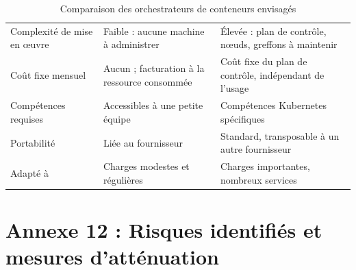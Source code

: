 \begin{table}[htbp]
\centering
\caption{Comparaison des orchestrateurs de conteneurs envisagés}
\label{tab:orchestrateur}
\small
\begin{tabularx}{\textwidth}{|L{3.0cm}|X|X|}
\hline
{}
 &  &  \\ \hline
Complexité de mise en œuvre & Faible : aucune machine à administrer & Élevée : plan de contrôle, nœuds, greffons à maintenir \\ \hline
Coût fixe mensuel & Aucun ; facturation à la ressource consommée & Coût fixe du plan de contrôle, indépendant de l'usage \\ \hline
Compétences requises & Accessibles à une petite équipe & Compétences Kubernetes spécifiques \\ \hline
Portabilité & Liée au fournisseur & Standard, transposable à un autre fournisseur \\ \hline
Adapté à & Charges modestes et régulières & Charges importantes, nombreux services \\ \hline
\end{tabularx}
\end{table}

\cleardoublepage
\chapter*{Annexe 12 : Risques identifiés et mesures d'atténuation}

\vspace{0.3cm}

